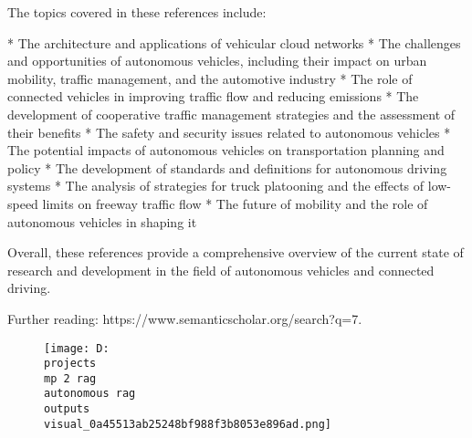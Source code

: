 \documentclass[12pt,a4paper]{article}
\begin{document}
The topics covered in these references include:

* The architecture and applications of vehicular cloud networks
* The challenges and opportunities of autonomous vehicles, including their impact on urban mobility, traffic management, and the automotive industry
* The role of connected vehicles in improving traffic flow and reducing emissions
* The development of cooperative traffic management strategies and the assessment of their benefits
* The safety and security issues related to autonomous vehicles
* The potential impacts of autonomous vehicles on transportation planning and policy
* The development of standards and definitions for autonomous driving systems
* The analysis of strategies for truck platooning and the effects of low-speed limits on freeway traffic flow
* The future of mobility and the role of autonomous vehicles in shaping it

Overall, these references provide a comprehensive overview of the current state of research and development in the field of autonomous vehicles and connected driving.

Further reading: https://www.semanticscholar.org/search?q=7.%
\begin{figure}[h]
\centering
\texttt{[image: D:\\projects\\mp 2 rag\\autonomous rag\\outputs\\visual\_0a45513ab25248bf988f3b8053e896ad.png]}
\end{figure}
\end{document}
